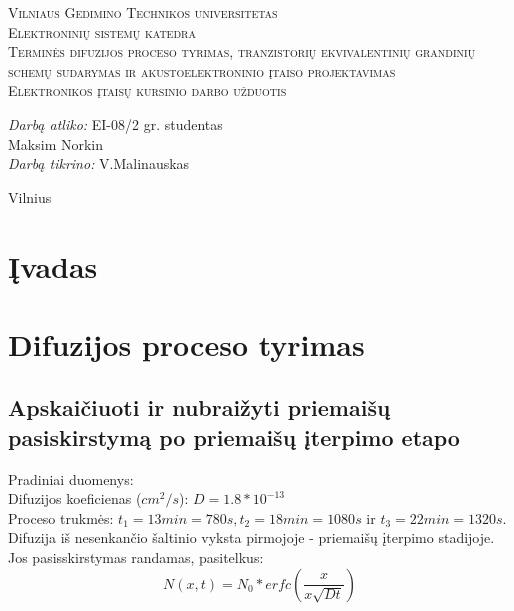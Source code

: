 \documentclass[11pt,a4paper]{article}
\begin{document}
\begin{titlepage}
  
  \begin{center}
    \textsc{\LARGE Vilniaus Gedimino Technikos universitetas}\\[2mm]
    \textsc{\Large Elektroninių sistemų katedra}\\[70mm]
    \textsc{\Large Terminės difuzijos proceso tyrimas, tranzistorių ekvivalentinių grandinių schemų sudarymas ir akustoelektroninio įtaiso projektavimas}\\[10mm]
    \textsc{\normalsize Elektronikos įtaisų kursinio darbo užduotis}\\[40mm]
    \begin{minipage}{1\textwidth}
      \begin{flushright}
        \emph{Darbą atliko:} EI-08/2 gr. studentas\\ Maksim Norkin\\
        \emph{Darbą tikrino:} V.Malinauskas\\
      \end{flushright}
    \end{minipage}
    \vfill
    {\large Vilnius \\ \the\year}
  \end{center}
\end{titlepage}
\tableofcontents
\newpage
\section{Įvadas}
\section{Difuzijos proceso tyrimas}
\subsection{Apskaičiuoti ir nubraižyti priemaišų pasiskirstymą po priemaišų įterpimo etapo}
Pradiniai duomenys:\\
Difuzijos koeficienas ($cm^2/s$): $D = 1.8*10^{-13}$\\
Proceso trukmės: $t_1 = 13min = 780s, t_2 = 18min = 1080s$ ir $t_3 = 22min = 1320s$.\\
Difuzija iš nesenkančio šaltinio vyksta pirmojoje - priemaišų įterpimo stadijoje. Jos pasisskirstymas randamas, pasitelkus:
\[N(x,t) = N_0*erfc \left( \frac{x}{x\sqrt{Dt}} \right) \] \\
\end{document}
